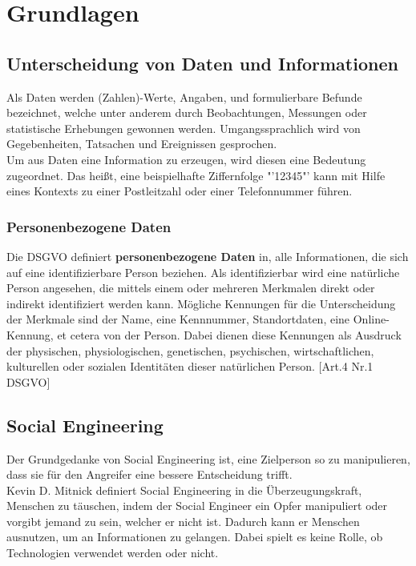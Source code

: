 
\chapter {Grundlagen}  %
\label{cha:grundlagen} %

\section{Unterscheidung von Daten und Informationen}
Als Daten werden (Zahlen)-Werte, Angaben, und formulierbare Befunde bezeichnet, welche unter anderem durch Beobachtungen, Messungen oder statistische Erhebungen gewonnen werden. \cite{daten} Umgangssprachlich wird von Gegebenheiten, Tatsachen und Ereignissen gesprochen.\cite{proebster2015rechnernetze}\\
Um aus Daten eine Information zu erzeugen, wird diesen eine Bedeutung zugeordnet. \cite{proebster2015rechnernetze} Das heißt, eine beispielhafte Ziffernfolge "'12345"' kann mit Hilfe eines Kontexts zu einer Postleitzahl oder einer Telefonnummer führen.
	\subsection{Personenbezogene Daten}
	Die DSGVO definiert \textbf{personenbezogene Daten} in, alle Informationen, die sich auf eine identifizierbare Person beziehen. Als identifizierbar wird eine natürliche Person angesehen, die mittels einem oder mehreren Merkmalen direkt oder indirekt identifiziert werden kann. Mögliche Kennungen für die Unterscheidung der Merkmale sind der Name, eine Kennnummer, Standortdaten, eine Online-Kennung, et cetera von der Person. Dabei dienen diese Kennungen als Ausdruck der physischen, physiologischen, genetischen, psychischen, wirtschaftlichen, kulturellen oder sozialen Identitäten dieser natürlichen Person. [Art.4 Nr.1 DSGVO]

\section{Social Engineering} %
\label {sec:Social Engineering} %
	Der Grundgedanke von Social Engineering ist, eine Zielperson so zu manipulieren, dass sie für den Angreifer eine bessere Entscheidung trifft. \cite{ArtOfHumanHacking} \\
	Kevin D. Mitnick definiert Social Engineering in die Überzeugungskraft, Menschen zu täuschen, indem der Social Engineer ein Opfer manipuliert oder vorgibt jemand zu sein, welcher er nicht ist. Dadurch kann er Menschen ausnutzen, um an Informationen zu gelangen. Dabei spielt es keine Rolle, ob Technologien verwendet werden oder nicht.\cite{ArtOfDeception}
	
